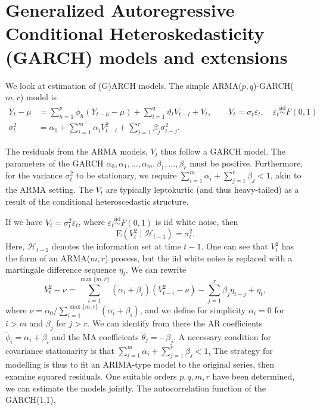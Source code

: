 \documentclass[]{book}
\begin{document}
\hypertarget{generalized-autoregressive-conditional-heteroskedasticity-garch-models-and-extensions}{%
\section{Generalized Autoregressive Conditional Heteroskedasticity (GARCH) models and extensions}\label{generalized-autoregressive-conditional-heteroskedasticity-garch-models-and-extensions}}

We look at estimation of (G)ARCH models.
The simple ARMA(\(p, q\))-GARCH(\(m, r\)) model is
\begin{align*}
Y_t -\mu &=   \sum_{h = 1}^p \phi_h (Y_{t-h}-\mu)+ \sum_{l = 1}^q \vartheta_lV_{t-l}+ V_t, \qquad V_t = \sigma_t\varepsilon_t, \quad\varepsilon_t\stackrel{\mathrm{iid}}{\sim} F(0, 1) \\ \sigma^2_t &= \alpha_0+\sum_{i = 1}^m \alpha_iV_{t-i}^2 + \sum_{j = 1}^r \beta_j\sigma^2_{t-j}. 
\end{align*}

The residuals from the ARMA models, \(V_t\) thus follow a GARCH model. The parameters of the GARCH \(\alpha_0, \alpha_1, \ldots, \alpha_m, \beta_1, \ldots, \beta_r\) must be positive. Furthermore, for the variance \(\sigma^2_t\) to be stationary, we require \(\sum_{i=1}^m \alpha_i + \sum_{j=1}^r \beta_j <1\), akin to the ARMA setting. The \(V_t\) are typically leptokurtic (and thus heavy-tailed) as a result of the conditional heteroscedastic structure.

If we have \(V_t=\sigma_t^2\varepsilon_t\), where \(\varepsilon_t \stackrel{\mathrm{iid}}{\sim}F(0, 1)\) is iid white noise, then
\[\mathrm{E}(V_t^2 \mid \mathcal{H}_{t-1}) = \sigma^2_t.\]
Here, \(\mathcal{H}_{t-1}\) denotes the information set at time \(t-1\). One can see that \(V_t^2\) has the form of an ARMA(\(m, r\)) process, but the iid white noise is replaced with a martingale difference sequence \(\eta_t\). We can rewrite
\[V_t^2 -\nu = \sum_{i=1}^{\max\{m, r\}} (\alpha_i+\beta_i)(V_{t-i}^2-\nu) - \sum_{j=1}^r \beta_j \eta_{t-j} + \eta_t,\]
where \(\nu = \alpha_0/ \sum_{i=1}^{\max\{m, r\}}(\alpha_i+\beta_i)\), and we define for simplicity \(\alpha_i=0\) for \(i>m\) and \(\beta_j\) for \(j>r\). We can identify from there the AR coefficients \(\tilde{\phi}_i=\alpha_i+\beta_i\) and the MA coefficients \(\tilde{\theta}_j=-\beta_j\). A necessary condition for covariance stationarity is that \(\sum_{i=1}^m \alpha_i + \sum_{j=1}^r \beta_j <1\),
The strategy for modelling is thus to fit an ARIMA-type model to the original series, then examine squared residuals. One suitable orders \(p, q, m, r\) have been determined, we can estimate the models jointly. The autocorrelation function of the GARCH(1,1),
\end{document}
